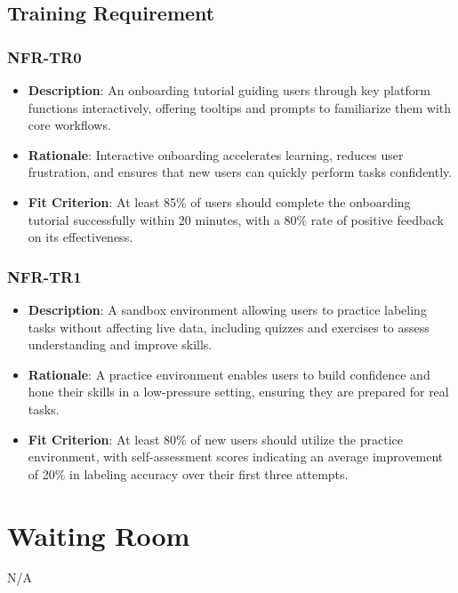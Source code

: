 \documentclass[12pt]{article}
\begin{document}
\subsection{Training Requirement}


\subsubsection*{NFR-TR0} 
        \begin{itemize} 
            \item \textbf{Description}: An onboarding tutorial guiding users through key platform functions interactively, offering tooltips and prompts to familiarize them with core workflows.  
            \item \textbf{Rationale}: Interactive onboarding accelerates learning, reduces user frustration, and ensures that new users can quickly perform tasks confidently.  
            \item \textbf{Fit Criterion}: At least 85\% of users should complete the onboarding tutorial successfully within 20 minutes, with a 80\% rate of positive feedback on its effectiveness.
        \end{itemize}
        \subsubsection*{NFR-TR1} 
        \begin{itemize} 
            \item \textbf{Description}: A sandbox environment allowing users to practice labeling tasks without affecting live data, including quizzes and exercises to assess understanding and improve skills.  
            \item \textbf{Rationale}: A practice environment enables users to build confidence and hone their skills in a low-pressure setting, ensuring they are prepared for real tasks.  
            \item \textbf{Fit Criterion}: At least 80\% of new users should utilize the practice environment, with self-assessment scores indicating an average improvement of 20\% in labeling accuracy over their first three attempts.
        \end{itemize}



\section{Waiting Room}
N/A
\end{document}
